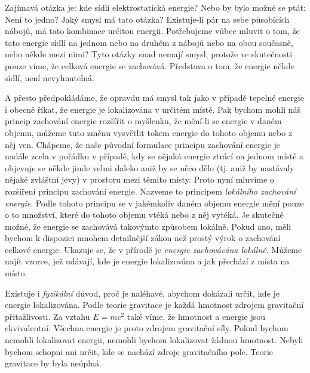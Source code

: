     Zajímavá otázka je: kde sídlí elektrostatická energie? Nebo by bylo možné se ptát: Není to
    jedno? Jaký smysl má tato otázka? Existuje-li pár na sebe působících nábojů, má tato kombinace
    určitou energii. Potřebujeme vůbec mluvit o tom, že tato energie sídlí na jednom nebo na druhém
    z nábojů nebo na obou současně, nebo někde mezi nimi? Tyto otázky snad nemají smysl, protože ve
    skutečnosti pouze víme, že celková energie se zachovává. Představa o tom, že energie někde
    sídlí, není nevyhnutelná.

    A přesto předpokládáme, že opravdu má smysl tak jako v případě tepelné energie i obecně říkat,
    že energie je lokalizována v určitém místě. Pak bychom mohli náš princip zachování energie
    rozšířit o myšlenku, že mění-li se energie v daném objemu, můžeme tuto změnu vysvětlit tokem
    energie do tohoto objemu nebo z něj ven. Chápeme, že naše původní formulace principu zachování
    energie je nadále zcela v pořádku v případě, kdy se nějaká energie ztrácí na jednom místě a
    objevuje se někde jinde velmi daleko aniž by se něco dělo (tj. aniž by nastávaly nějaké zvláštní
    jevy) v prostoru mezi těmito místy. Proto nyní mluvíme o rozšíření principu zachování energie.
    Nazveme to principem \emph{lokálního zachování energie}. Podle tohoto principu se v jakémkoliv
    daném objemu energie mění pouze o to množství, které do tohoto objemu vtéká nebo z něj vytéká.
    Je skutečně možné, že energie se zachovává takovýmto způsobem lokálně. Pokud ano, měli bychom k
    dispozici mnohem detailnější zákon než prostý výrok o zachování celkové energie. Ukazuje se, že
    v přírodě je \emph{energie zachovávána lokálně}. Můžeme najít vzorce, jež udávají, kde je
    energie lokalizována a jak přechází z místa na místo.

    Existuje i \emph{fyzikální} důvod, proč je naléhavé, abychom dokázali určit, kde je energie
    lokalizována. Podle teorie gravitace je každá hmotnost zdrojem gravitační přitažlivosti. Za
    vztahu \(E=mc^2\) také víme, že hmotnost a energie jsou ekvivalentní. Všechna energie je proto
    zdrojem gravitační síly. Pokud bychom nemohli lokalizovat energii, nemohli bychom lokalizovat
    žádnou hmotnost. Nebyli bychom schopni ani určit, kde se nachází zdroje gravitačního pole.
    Teorie gravitace by byla neúplná.

